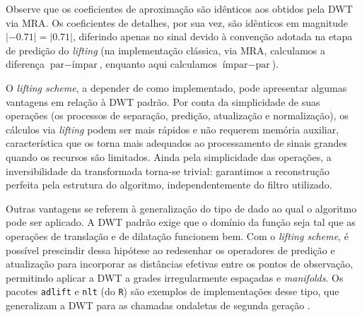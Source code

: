 \begin{example}
\begin{enumerate}
    \end{enumerate}

    Observe que os coeficientes de aproximação são idênticos aos obtidos pela DWT via MRA. 
    Os coeficientes de detalhes, por sua vez, são idênticos em magnitude \(\lvert -0.71\rvert = \lvert 0.71\rvert\), diferindo apenas no sinal devido à convenção adotada na etapa de predição do \emph{lifting} (na implementação clássica, via MRA, calculamos a diferença \(\text{par} - \text{ímpar}\), enquanto aqui calculamos \(\text{ímpar} - \text{par}\)).

\end{example}

O \emph{lifting scheme}, a depender de como implementado, pode apresentar algumas vantagens em relação à DWT padrão. 
Por conta da simplicidade de suas operações (os processos de separação, predição, atualização e normalização), os cálculos via \emph{lifting} podem ser mais rápidos e não requerem memória auxiliar, característica que os torna mais adequados ao processamento de sinais grandes quando os recursos são limitados. 
Ainda pela simplicidade das operações, a inversibilidade da transformada torna-se trivial: garantimos a reconstrução perfeita pela estrutura do algoritmo, independentemente do filtro utilizado.

Outras vantagens se referem à generalização do tipo de dado ao qual o algoritmo pode ser aplicado. A DWT padrão exige que o domínio da função seja tal que as operações de translação e de dilatação funcionem bem. Com o \emph{lifting scheme}, é possível prescindir dessa hipótese ao redesenhar os operadores de predição e atualização para incorporar as distâncias efetivas entre os pontos de observação, permitindo aplicar a DWT a grades irregularmente espaçadas e \emph{manifolds}. 
Os pacotes \texttt{adlift} e \texttt{nlt} \cite{nunes_adaptive_2006, knight_nlt_2008} (do \texttt{R}) são exemplos de implementações desse tipo, que generalizam a DWT para as chamadas ondaletas de segunda geração \cite{sweldens_lifting_1995}.

